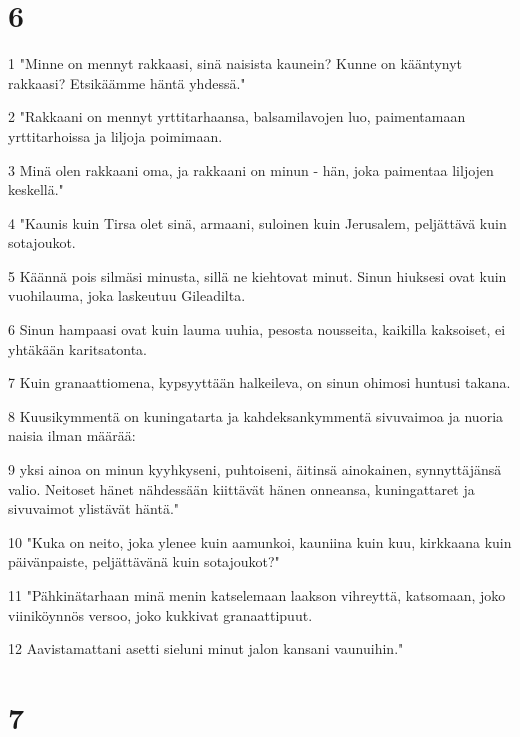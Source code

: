 \chapter{6}

\par 1 "Minne on mennyt rakkaasi, sinä naisista kaunein? Kunne on kääntynyt rakkaasi? Etsikäämme häntä yhdessä."
\par 2 "Rakkaani on mennyt yrttitarhaansa, balsamilavojen luo, paimentamaan yrttitarhoissa ja liljoja poimimaan.
\par 3 Minä olen rakkaani oma, ja rakkaani on minun - hän, joka paimentaa liljojen keskellä."
\par 4 "Kaunis kuin Tirsa olet sinä, armaani, suloinen kuin Jerusalem, peljättävä kuin sotajoukot.
\par 5 Käännä pois silmäsi minusta, sillä ne kiehtovat minut. Sinun hiuksesi ovat kuin vuohilauma, joka laskeutuu Gileadilta.
\par 6 Sinun hampaasi ovat kuin lauma uuhia, pesosta nousseita, kaikilla kaksoiset, ei yhtäkään karitsatonta.
\par 7 Kuin granaattiomena, kypsyyttään halkeileva, on sinun ohimosi huntusi takana.
\par 8 Kuusikymmentä on kuningatarta ja kahdeksankymmentä sivuvaimoa ja nuoria naisia ilman määrää:
\par 9 yksi ainoa on minun kyyhkyseni, puhtoiseni, äitinsä ainokainen, synnyttäjänsä valio. Neitoset hänet nähdessään kiittävät hänen onneansa, kuningattaret ja sivuvaimot ylistävät häntä."
\par 10 "Kuka on neito, joka ylenee kuin aamunkoi, kauniina kuin kuu, kirkkaana kuin päivänpaiste, peljättävänä kuin sotajoukot?"
\par 11 "Pähkinätarhaan minä menin katselemaan laakson vihreyttä, katsomaan, joko viiniköynnös versoo, joko kukkivat granaattipuut.
\par 12 Aavistamattani asetti sieluni minut jalon kansani vaunuihin."

\chapter{7}

